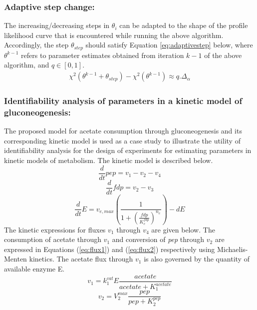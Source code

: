 \documentclass[10pt]{report}
\begin{document}
	\subsubsection{Adaptive step change:}
	The increasing/decreasing steps in $\theta_i$ can be adapted to the shape of the profile likelihood curve that is encountered while running the above algorithm. Accordingly, the step $\theta_{step}$ should satisfy Equation \ref{eq:adaptivestep} below, where $\theta^{k-1}$ refers to parameter estimates obtained from iteration $k-1$ of the above algorithm, and $q\in \left[0,1\right]$.
	\begin{align}\label{eq:adaptivestep}
	\chi^2\left(\theta^{k-1}+\theta_{step}\right) - \chi^2(\theta^{k-1}) \approx q.\Delta_{\alpha}
	\end{align}
	
	\subsubsection{Identifiability analysis of parameters in a kinetic model of gluconeogenesis:}
	The proposed model for acetate consumption through gluconeogenesis and its corresponding kinetic model is used as a case study to illustrate the utility of identifiability analysis for the design of experiments for estimating parameters in kinetic models of metabolism. The kinetic model is described below.
	\begin{equation}\label{eq:ode1}
	\frac{d}{dt}pep=v_1-v_2-v_4
	\end{equation}
	\begin{equation}\label{eq:ode2}
	\frac{d}{dt}fdp=v_2-v_3
	\end{equation}
	\begin{equation}\label{eq:ode3}
	\frac{d}{dt}E=v_{e,max}\left(\frac{1}{1+\left(\frac{fdp}{K_{e}^{fdp}}\right)^{n_e}}\right) - d E
	\end{equation}
	The kinetic expressions for fluxes $v_1$ through $v_4$ are given below. The consumption of acetate through $v_1$ and conversion of \textit{pep} through $v_2$ are expressed in Equations (\ref{eq:flux1}) and (\ref{eq:flux2}) respectively using Michaelis-Menten kinetics. The acetate flux through $v_1$ is also governed by the quantity of available enzyme E. 
	\begin{equation}\label{eq:flux1}
	v_1 = k_{1}^{cat}E\frac{acetate}{acetate+K_{1}^{acetate}}
	\end{equation}	
	\begin{equation}\label{eq:flux2}
	v_2 = V_{2}^{max}\frac{pep}{pep+K_{2}^{pep}}
	\end{equation}
\end{document}
